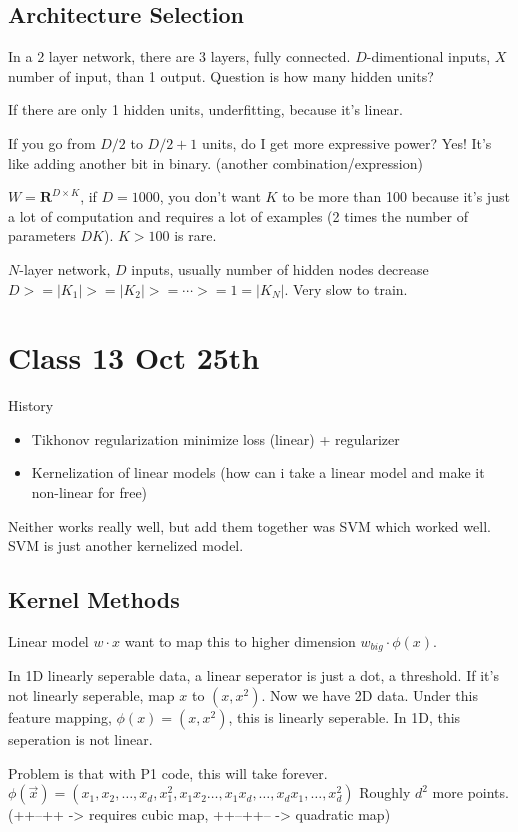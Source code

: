 \subsection{Architecture Selection}
In a 2 layer network, there are 3 layers, fully connected. $D$-dimentional inputs, $X$
number of input, than 1 output.
Question is how many hidden units? 

If there are only 1 hidden units, underfitting, because it's linear.

If you go from $D/2$ to $D/2+1$ units, do I get more expressive power?
Yes! It's like adding another bit in binary. (another
combination/expression)

$W=\mathbf{R}^{D\times K}$, if $D=1000$, you don't want $K$ to be more
than 100 because it's just a lot of computation and requires a lot of
examples (2 times the number of parameters $DK$). $K>100$ is rare.

$N$-layer network, $D$ inputs, usually number of hidden nodes decrease
$D>=|K_1|>=|K_2|>=\cdots >=1=|K_N|$. Very slow to train.

\pagebreak

\section{Class 13 Oct 25th}
\label{sec:class13}
History
\begin{itemize}
\item Tikhonov regularization minimize loss (linear) + regularizer
\item Kernelization of linear models (how can i take a linear model
  and make it non-linear for free)
\end{itemize}
Neither works really well, but add them together was SVM which worked
well. SVM is just another kernelized model.

\subsection{Kernel Methods}
Linear model $w\cdot x$ want to map this to higher dimension
$w_{big}\cdot\phi(x)$.

In 1D linearly seperable data, a linear seperator is just a dot, a
threshold.
If it's not linearly seperable, map $x$ to $(x,x^2)$. Now we have 2D
data. Under this feature mapping, $\phi(x) = (x,x^2)$, this is
linearly seperable.
In 1D, this seperation is not linear.

Problem is that with P1 code, this will take forever. 
$\phi(\vec x) = (x_1, x_2, \dots, x_d, x_1^2, x_1x_2 \dots, x_1x_d,
\dots, x_dx_1, \dots, x_d^2)$
Roughly $d^2$ more points. (++--++ -> requires cubic map, ++--++-- ->
quadratic map)

